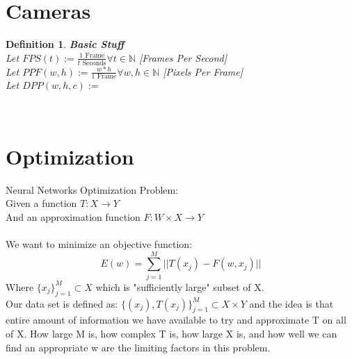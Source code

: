 \documentclass[12pt]{extarticle}
\theoremstyle{plain}
\theoremstyle{plain}
\theoremstyle{plain}
\theoremstyle{Definition}
\newtheorem{def.}{Definition}[section]
\theoremstyle{Definition}
\theoremstyle{plain}
\theoremstyle{plain}
\newcommand{\cut}[0]{\noindent\framebox[\linewidth]{\rule{\linewidth}{2pt}}\\}
\begin{document}
	\section{Cameras}
	
	\begin{def.} \textbf{Basic Stuff} \\
		Let $FPS(t) := \frac{1 \text{ Frame}}{t \text{ Seconds}} \forall t \in \mathbb{N}$ \hfill [Frames Per Second] \\
		Let $PPF(w,h) := \frac{w*h}{1 \text{ Frame}} \forall w,h \in \mathbb{N}$ \hfill [Pixels Per Frame] \\
		Let $DPP(w,h,c) := $
		
	\end{def.}
	\newpage
	\cut
	\section{Optimization}
		Neural Networks Optimization Problem: \\ 
		Given a function $T: X \to Y$ \\
		And an approximation function $F : W \times X \to Y$ \\ \\
		We want to minimize an objective function: \\ 
		$$E(w) = \sum_{j=1}^{M} ||T(x_j) - F(w,x_j)||$$
		Where $\{x_j\}_{j=1}^M \subset X$ which is "sufficiently large" subset of X. \\
		Our data set is defined as: $\{(x_j),T(x_j)\}_{j=1}^M \subset X \times Y$ and the idea is that entire amount of information we have available to try and approximate T on all of X. How large M is, how complex T is, how large X is, and how well we can find an appropriate w are the limiting factors in this problem. \\
		
\end{document}
